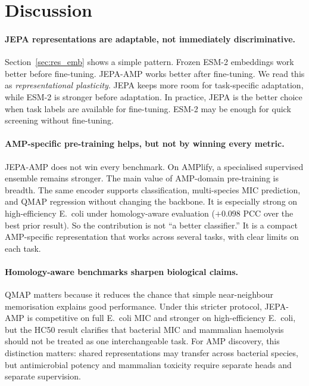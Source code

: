 \section{Discussion}

\paragraph{JEPA representations are adaptable, not immediately discriminative.}
Section~\ref{sec:res_emb} shows a simple pattern.
Frozen ESM-2 embeddings work better before fine-tuning.
JEPA-AMP works better after fine-tuning.
We read this as \emph{representational plasticity}.
JEPA keeps more room for task-specific adaptation, while ESM-2 is stronger
before adaptation.
In practice, JEPA is the better choice when task labels are available for
fine-tuning. ESM-2 may be enough for quick screening without fine-tuning.

\paragraph{AMP-specific pre-training helps, but not by winning every metric.}
JEPA-AMP does not win every benchmark.
On AMPlify, a specialised supervised ensemble remains stronger.
The main value of AMP-domain pre-training is breadth.
The same encoder supports classification, multi-species MIC prediction, and
QMAP regression without changing the backbone.
It is especially strong on high-efficiency E.~coli under homology-aware
evaluation ($+0.098$ PCC over the best prior result).
So the contribution is not ``a better classifier.''
It is a compact AMP-specific representation that works across several tasks,
with clear limits on each task.

\paragraph{Homology-aware benchmarks sharpen biological claims.}
QMAP matters because it reduces the chance that simple near-neighbour
memorisation explains good performance.
Under this stricter protocol, JEPA-AMP is competitive on full E.~coli MIC and
stronger on high-efficiency E.~coli, but the HC50 result clarifies that bacterial
MIC and mammalian haemolysis should not be treated as one interchangeable task.
For AMP discovery, this distinction matters: shared representations may transfer
across bacterial species, but antimicrobial potency and mammalian toxicity require
separate heads and separate supervision.

